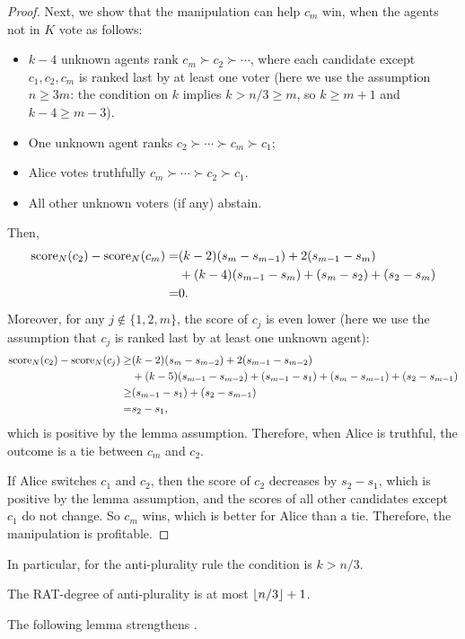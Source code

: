 \begin{proof}
Next, we show that the manipulation can help $c_m$ win, when the agents not in $K$ vote as follows:
\begin{itemize}
\item $k-4$ unknown agents rank $c_m\succ c_2\succ \cdots $,
where each candidate except $c_1,c_2,c_m$ is ranked last by at least one voter (here we use the assumption $n\geq 3m$: the condition on $k$ implies $k>n/3\geq m$, so $k\geq m+1$ and $k-4\geq m-3$).
\item One unknown agent ranks 
$c_2\succ \cdots \succ c_m \succ c_1$;
\item Alice votes truthfully $c_m\succ  \cdots \succ c_2 \succ c_1$.  
\item All other unknown voters (if any) abstain.
\end{itemize}
Then,
\begin{align*}
\operatorname{score}_N(c_2) - \operatorname{score}_N(c_m)
=&
(k-2)(s_{m}-s_{m-1}) 
+ 2(s_{m-1}-s_{m})
\\
&+
(k-4)(s_{m-1}-s_{m}) 
+ (s_m-s_2)
+ (s_2-s_m)
\\
=&
0.
\end{align*}
Moreover, for any $j\not\in\{1,2,m\}$, the score of $c_j$ is even lower (here we use the assumption that $c_j$ is ranked last by at least one unknown agent):
\begin{align*}
\operatorname{score}_N(c_2) - \operatorname{score}_N(c_j)
\geq &
(k-2)(s_{m}-s_{m-2}) 
+ 2(s_{m-1}-s_{m-2})
\\
&+
(k-5)(s_{m-1}-s_{m-2}) 
+ (s_{m-1}-s_1)
+ (s_m-s_{m-1})
+ (s_2-s_{m-1})
\\
\geq & (s_{m-1}-s_{1})
+ (s_2-s_{m-1})
\\
= & s_2 - s_1,
\end{align*}
which is positive by the lemma assumption.
Therefore, when Alice is truthful, the outcome is a tie between $c_m$ and $c_2$.

If Alice switches $c_1$ and $c_2$, then the score of $c_2$ decreases by $s_2-s_1$, which is positive by the lemma assumption, and the scores of all other candidates except $c_1$ do not change. So $c_m$ wins, which is better for Alice than a tie.
Therefore, the manipulation is profitable.
\end{proof}

In particular, for the anti-plurality rule the condition is $k>n/3$.
\begin{corollary}
The RAT-degree of anti-plurality is at most $\left\lfloor n/3 \right\rfloor+1$.
\end{corollary}
\fi

The following lemma strengthens 
.

